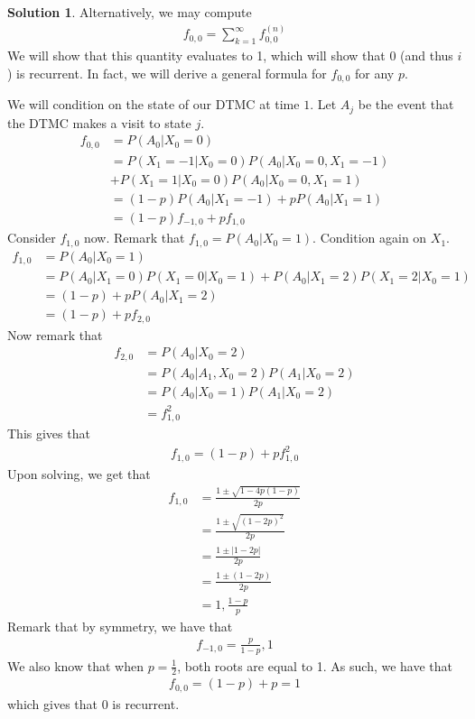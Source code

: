 \documentclass[11pt]{amsart}
\theoremstyle{definition}
\newtheorem{solution}[theorem]{Solution}
\numberwithin{equation}{section}
\begin{document}
\begin{solution}
     Alternatively, we may compute 
     \begin{align*}
         f_{0,0}=\sum_{k=1}^\infty f_{0,0}^{(n)}
     \end{align*}
     We will show that this quantity evaluates to 1, which will show that $0$ (and thus $i$) is recurrent. In fact, we will derive a general formula for $f_{0,0}$ for any $p$.

     We will condition on the state of our DTMC at time $1$. Let $A_j$ be the event that the DTMC makes a visit to state $j$.
     \begin{align*}
        f_{0,0}&=P(A_0|X_0=0)\\
        &=P(X_1=-1|X_0=0)P(A_0|X_0=0,X_1=-1)\\
        &+P(X_1=1|X_0=0)P(A_0|X_0=0,X_1=1)\\
        &=(1-p)P(A_0|X_1=-1)+pP(A_0|X_1=1)\\
        &=(1-p)f_{-1,0}+pf_{1,0}
     \end{align*}
     Consider $f_{1,0}$ now. Remark that $f_{1,0}=P(A_0|X_0=1)$. Condition again on $X_1$.
     \begin{align*}
         f_{1,0}&=P(A_0|X_0=1)\\
         &=P(A_0|X_1=0)P(X_1=0|X_0=1)+P(A_0|X_1=2)P(X_1=2|X_0=1)\\
         &=(1-p)+pP(A_0|X_1=2)\\
         &=(1-p)+pf_{2,0}
     \end{align*}
     Now remark that 
     \begin{align*}
         f_{2,0}&=P(A_0|X_0=2)\\
         &=P(A_0|A_1,X_0=2)P(A_1|X_0=2)\\
         &=P(A_0|X_0=1)P(A_1|X_0=2)\\
         &=f_{1,0}^2
     \end{align*}
     This gives that
     \begin{align*}
         f_{1,0}=(1-p)+pf_{1,0}^2
     \end{align*}
     Upon solving, we get that
     \begin{align*}
         f_{1,0}&=\frac{1\pm\sqrt{1-4p(1-p)}}{2p}\\
         &=\frac{1\pm\sqrt{(1-2p)^2}}{2p}\\
         &=\frac{1\pm|1-2p|}{2p}\\
         &=\frac{1\pm(1-2p)}{2p}\\
         &=1,\frac{1-p}{p}
     \end{align*}
     Remark that by symmetry, we have that
     \begin{align*}
         f_{-1,0}=\frac{p}{1-p},1
     \end{align*}
     We also know that when $p=\frac{1}{2}$, both roots are equal to 1. As such, we have that
     \begin{align*}
         f_{0,0}=(1-p)+p=1
     \end{align*}
     which gives that $0$ is recurrent.
     

\end{solution}
\end{document}
